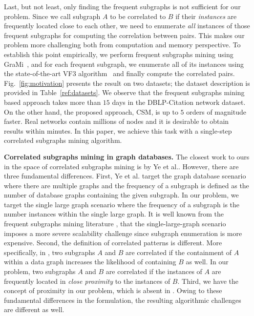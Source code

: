  Last, but not least, only finding the frequent subgraphs is not sufficient for our problem. Since we call subgraph $A$ to be correlated to $B$ if their \emph{instances} are frequently located close to each other, we need to enumerate \emph{all} instances of those frequent subgraphs for computing the correlation
between pairs. This makes our problem more challenging both from computation and memory perspective. To establish this point empirically, we perform frequent subgraphs mining using GraMi~\cite{EASK14}, and for each frequent subgraph, we enumerate all of its instances using the state-of-the-art VF3 algorithm~\cite{CarlettiFSV18} and finally compute the correlated pairs. Fig.~\ref{fig:motivation} presents the result on two datasets; the dataset description is provided in Table~\ref{ref:datasets}. We observe that the frequent subgraphs mining based approach takes more than $15$ days in the DBLP-Citation network dataset. On the other hand, the proposed approach, CSM, is up to $5$ orders of magnitude faster. Real networks contain millions of nodes and it is desirable to obtain results within minutes. In this paper, we achieve this task with a single-step correlated subgraphs mining algorithm. %


\textbf{Correlated subgraphs mining in graph databases. } The closest work to ours in the space of correlated subgraphs mining is by Ye et al.\cite{KCY09}. However, there are three fundamental differences. First, Ye et al. target the graph database scenario where there are multiple graphs and the frequency of a subgraph is defined as the number of database graphs containing the given subgraph. In our problem, we target the single large graph scenario where the frequency of a subgraph is the number instances within the single large graph. It is well known from the frequent subgraphs mining literature \cite{EASK14,KhanR17}, that the single-large-graph scenario imposes a more severe scalability challenge since subgraph enumeration is more expensive. Second, the definition of correlated patterns is different. More specifically, in \cite{KCY09}, two subgraphs $A$ and $B$ are correlated if the containment of $A$ within a data graph increases the likelihood of containing $B$ as well. In our problem, two subgraphs $A$ and $B$ are correlated if the instances of $A$ are frequently located in \emph{close proximity} to the instances of $B$. Third, we have the concept of proximity in our problem, which is absent in \cite{KCY09}. Owing to these fundamental differences in the formulation, the resulting algorithmic challenges are different as well.

